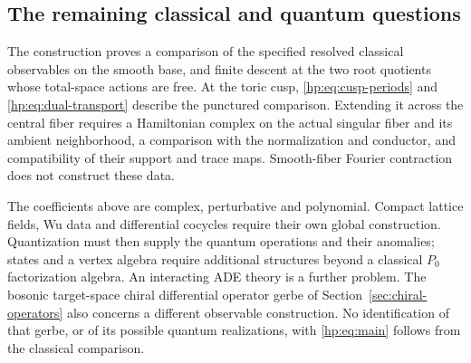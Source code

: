 \subsection{The remaining classical and quantum questions}
\label{hp:subsec:scope}

The construction proves a comparison of the specified resolved
classical observables on the smooth base, and finite descent at
the two root quotients whose total-space actions are free. At the toric cusp,
\eqref{hp:eq:cusp-periods} and \eqref{hp:eq:dual-transport}
describe the punctured comparison. Extending it across the
central fiber requires a Hamiltonian complex on the actual
singular fiber and its ambient neighborhood, a comparison with
the normalization and conductor, and compatibility of their
support and trace maps. Smooth-fiber Fourier contraction does
not construct these data.

The coefficients above are complex, perturbative and
polynomial. Compact lattice fields, Wu data and differential
cocycles require their own global construction. Quantization
must then supply the quantum operations and their anomalies;
states and a vertex algebra require additional structures
beyond a classical $P_0$ factorization algebra. An interacting
ADE theory is a further problem. The bosonic target-space
chiral differential operator gerbe of
Section~\ref{sec:chiral-operators} also concerns a different
observable construction. No identification of that gerbe, or
of its possible quantum realizations, with
\eqref{hp:eq:main} follows from the classical comparison.

